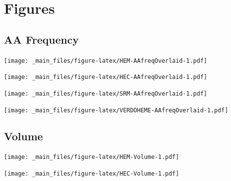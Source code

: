 \documentclass[a4paper, nobind]{templates/ociamthesis}
\let\origfigure\figure
\let\endorigfigure\endfigure
\renewenvironment{figure}[1][2] {
    \expandafter\origfigure\expandafter[H]
} {
    \endorigfigure
}
\begin{document}
\startappendices

\hypertarget{a-figures}{%
\chapter{Figures}\label{a-figures}}

\minitoc

\hypertarget{figs-aaFreqOverlaid}{%
\section{AA Frequency}\label{figs-aaFreqOverlaid}}

\begin{figure}
\centering
\texttt{[image: \_main\_files/figure-latex/HEM-AAfreqOverlaid-1.pdf]}
\caption{\label{fig:HEM-AAfreqOverlaid}HEM: AA Frequency}
\end{figure}

\begin{figure}
\centering
\texttt{[image: \_main\_files/figure-latex/HEC-AAfreqOverlaid-1.pdf]}
\caption{\label{fig:HEC-AAfreqOverlaid}HEC: AA Frequency}
\end{figure}

\begin{figure}
\centering
\texttt{[image: \_main\_files/figure-latex/SRM-AAfreqOverlaid-1.pdf]}
\caption{\label{fig:SRM-AAfreqOverlaid}SRM: AA Frequency}
\end{figure}

\begin{figure}
\centering
\texttt{[image: \_main\_files/figure-latex/VERDOHEME-AAfreqOverlaid-1.pdf]}
\caption{\label{fig:VERDOHEME-AAfreqOverlaid}VERDOHEME: AA Frequency}
\end{figure}

\hypertarget{figs-vol}{%
\section{Volume}\label{figs-vol}}

\begin{figure}
\centering
\texttt{[image: \_main\_files/figure-latex/HEM-Volume-1.pdf]}
\caption{\label{fig:HEM-Volume}HEM: Volume}
\end{figure}

\begin{figure}
\centering
\texttt{[image: \_main\_files/figure-latex/HEC-Volume-1.pdf]}
\caption{\label{fig:HEC-Volume}HEC: Volume}
\end{figure}
\end{document}
